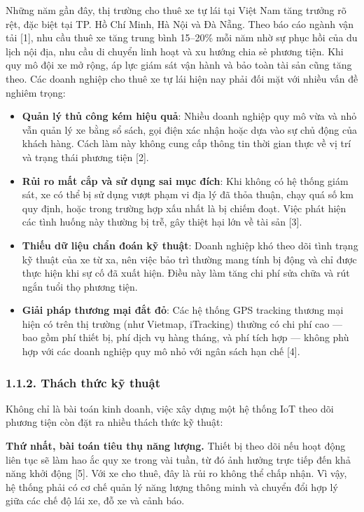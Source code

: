 \documentclass[13pt,a4paper]{extarticle}
\renewcommand{\\}{\thesislongtableorignewline\hline}%
\providecommand{\tightlist}{%
  \setlength{\itemsep}{0pt}\setlength{\parskip}{0pt}}
\begin{document}
Những năm gần đây, thị trường cho thuê xe tự lái tại Việt Nam tăng
trưởng rõ rệt, đặc biệt tại TP. Hồ Chí Minh, Hà Nội và Đà Nẵng. Theo báo
cáo ngành vận tải {[}1{]}, nhu cầu thuê xe tăng trung bình 15--20\% mỗi
năm nhờ sự phục hồi của du lịch nội địa, nhu cầu di chuyển linh hoạt và
xu hướng chia sẻ phương tiện. Khi quy mô đội xe mở rộng, áp lực giám sát
vận hành và bảo toàn tài sản cũng tăng theo. Các doanh nghiệp cho thuê
xe tự lái hiện nay phải đối mặt với nhiều vấn đề nghiêm trọng:

\begin{itemize}
\tightlist
\item
  \textbf{Quản lý thủ công kém hiệu quả}: Nhiều doanh nghiệp quy mô vừa
  và nhỏ vẫn quản lý xe bằng sổ sách, gọi điện xác nhận hoặc dựa vào sự
  chủ động của khách hàng. Cách làm này không cung cấp thông tin thời
  gian thực về vị trí và trạng thái phương tiện {[}2{]}.
\item
  \textbf{Rủi ro mất cắp và sử dụng sai mục đích}: Khi không có hệ thống
  giám sát, xe có thể bị sử dụng vượt phạm vi địa lý đã thỏa thuận, chạy
  quá số km quy định, hoặc trong trường hợp xấu nhất là bị chiếm đoạt.
  Việc phát hiện các tình huống này thường bị trễ, gây thiệt hại lớn về
  tài sản {[}3{]}.
\item
  \textbf{Thiếu dữ liệu chẩn đoán kỹ thuật}: Doanh nghiệp khó theo dõi
  tình trạng kỹ thuật của xe từ xa, nên việc bảo trì thường mang tính bị
  động và chỉ được thực hiện khi sự cố đã xuất hiện. Điều này làm tăng
  chi phí sửa chữa và rút ngắn tuổi thọ phương tiện.
\item
  \textbf{Giải pháp thương mại đắt đỏ}: Các hệ thống GPS tracking thương
  mại hiện có trên thị trường (như Vietmap, iTracking) thường có chi phí
  cao --- bao gồm phí thiết bị, phí dịch vụ hàng tháng, và phí tích hợp
  --- không phù hợp với các doanh nghiệp quy mô nhỏ với ngân sách hạn
  chế {[}4{]}.
\end{itemize}

\subsubsection{1.1.2. Thách thức kỹ
thuật}\label{112-thuxe1ch-thux1ee9c-kux1ef9-thuux1eadt}

Không chỉ là bài toán kinh doanh, việc xây dựng một hệ thống IoT theo
dõi phương tiện còn đặt ra nhiều thách thức kỹ thuật:

\textbf{Thứ nhất, bài toán tiêu thụ năng lượng.} Thiết bị theo dõi nếu
hoạt động liên tục sẽ làm hao ắc quy xe trong vài tuần, từ đó ảnh hưởng
trực tiếp đến khả năng khởi động {[}5{]}. Với xe cho thuê, đây là rủi ro
không thể chấp nhận. Vì vậy, hệ thống phải có cơ chế quản lý năng lượng
thông minh và chuyển đổi hợp lý giữa các chế độ lái xe, đỗ xe và cảnh
báo.
\end{document}
